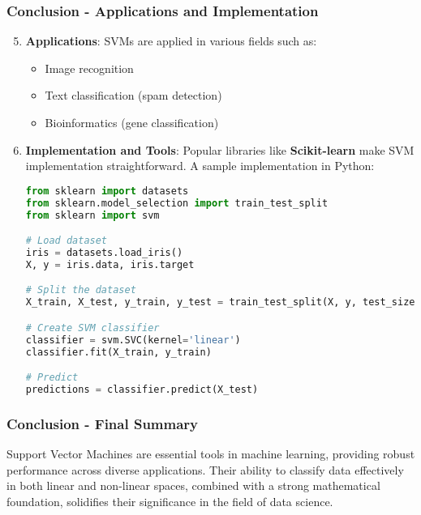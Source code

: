 \documentclass{beamer}
\begin{document}
\begin{frame}[fragile]
    \frametitle{Conclusion - Applications and Implementation}

    \begin{enumerate}
        \setcounter{enumi}{4}
        \item \textbf{Applications}:
        SVMs are applied in various fields such as:
        \begin{itemize}
            \item Image recognition
            \item Text classification (spam detection)
            \item Bioinformatics (gene classification)
        \end{itemize}

        \item \textbf{Implementation and Tools}:
        Popular libraries like \textbf{Scikit-learn} make SVM implementation straightforward. 
        A sample implementation in Python:
        
        \begin{lstlisting}[language=Python]
from sklearn import datasets
from sklearn.model_selection import train_test_split
from sklearn import svm

# Load dataset
iris = datasets.load_iris()
X, y = iris.data, iris.target

# Split the dataset
X_train, X_test, y_train, y_test = train_test_split(X, y, test_size=0.2, random_state=42)

# Create SVM classifier
classifier = svm.SVC(kernel='linear')
classifier.fit(X_train, y_train)

# Predict
predictions = classifier.predict(X_test)
        \end{lstlisting}
    \end{enumerate}
\end{frame}

\begin{frame}[fragile]
    \frametitle{Conclusion - Final Summary}

    Support Vector Machines are essential tools in machine learning, providing robust performance across diverse applications. 
    Their ability to classify data effectively in both linear and non-linear spaces, combined with a strong mathematical foundation, solidifies their significance in the field of data science.
\end{frame}
\end{document}
